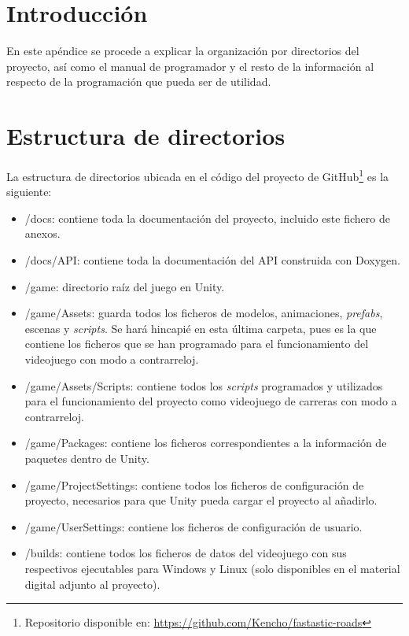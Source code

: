 
\section{Introducción}

En este apéndice se procede a explicar la organización por directorios del proyecto, así como el manual de programador y el resto de la información al respecto de la programación que pueda ser de utilidad.

\section{Estructura de directorios}

La estructura de directorios ubicada en el código del proyecto de GitHub\footnote{Repositorio disponible en: \url{https://github.com/Kencho/fastastic-roads}} es la siguiente:

\begin{itemize}
\tightlist
	\item /docs: contiene toda la documentación del proyecto, incluido este fichero de anexos. 
	\item /docs/API: contiene toda la documentación del API construida con Doxygen.
	\item /game: directorio raíz del juego en Unity.
	\item /game/Assets: guarda todos los ficheros de modelos, animaciones, \textit{prefabs}, escenas y \textit{scripts}. Se hará hincapié en esta última carpeta, pues es la que contiene los ficheros que se han programado para el funcionamiento del videojuego con modo a contrarreloj.
	\item /game/Assets/Scripts: contiene todos los \textit{scripts} programados y utilizados para el funcionamiento del proyecto como videojuego de carreras con modo a contrarreloj.
	\item /game/Packages: contiene los ficheros correspondientes a la información de paquetes dentro de Unity.
	\item /game/ProjectSettings: contiene todos los ficheros de configuración de proyecto, necesarios para que Unity pueda cargar el proyecto al añadirlo.
	\item /game/UserSettings: contiene los ficheros de configuración de usuario.
	\item /builds: contiene todos los ficheros de datos del videojuego con sus respectivos ejecutables para Windows y Linux (solo disponibles en el material digital adjunto al proyecto).
\end{itemize}

